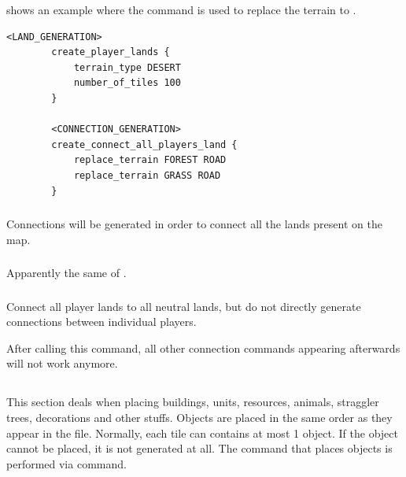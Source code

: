      shows an example where the command is used to replace the terrain to .

    \begin{lstlisting}[language={rms}, label={lst:connectionteam}, caption={Example showing how you can connect teammates with roads.}]
        <LAND_GENERATION>
        create_player_lands {
            terrain_type DESERT
            number_of_tiles 100
        }

        <CONNECTION_GENERATION>
        create_connect_all_players_land {
            replace_terrain FOREST ROAD
            replace_terrain GRASS ROAD
        }
    \end{lstlisting}

    \subsubsection{}

    Connections will be generated in order to connect all the lands present on the map.

    \subsubsection{}

    Apparently the same of .

    \subsubsection{}

    Connect all player lands to all neutral lands, but do not directly generate connections between individual players.

    \begin{attention}
        After calling this command, all other connection commands appearing afterwards will not work anymore.
    \end{attention}

    \subsection{}

    This section deals when placing buildings, units, resources, animals, straggler trees, decorations and other stuffs. Objects are placed in the same order as they appear in the  file. Normally, each tile can contains at most 1 object. If the object cannot be placed, it is not generated at all. The command that places objects is performed via  command.

